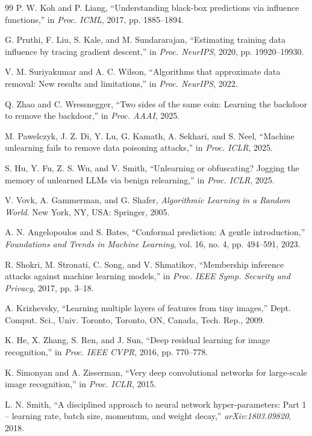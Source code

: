 \begin{thebibliography}{99}
P. W. Koh and P. Liang, ``Understanding black-box predictions via influence functions,'' in \emph{Proc. ICML}, 2017, pp. 1885--1894.

G. Pruthi, F. Liu, S. Kale, and M. Sundararajan, ``Estimating training data influence by tracing gradient descent,'' in \emph{Proc. NeurIPS}, 2020, pp. 19920--19930.

V. M. Suriyakumar and A. C. Wilson, ``Algorithms that approximate data removal: New results and limitations,'' in \emph{Proc. NeurIPS}, 2022.

Q. Zhao and C. Wressnegger, ``Two sides of the same coin: Learning the backdoor to remove the backdoor,'' in \emph{Proc. AAAI}, 2025.

M. Pawelczyk, J. Z. Di, Y. Lu, G. Kamath, A. Sekhari, and S. Neel, ``Machine unlearning fails to remove data poisoning attacks,'' in \emph{Proc. ICLR}, 2025.

S. Hu, Y. Fu, Z. S. Wu, and V. Smith, ``Unlearning or obfuscating? Jogging the memory of unlearned LLMs via benign relearning,'' in \emph{Proc. ICLR}, 2025.

V. Vovk, A. Gammerman, and G. Shafer, \emph{Algorithmic Learning in a Random World}. New York, NY, USA: Springer, 2005.

A. N. Angelopoulos and S. Bates, ``Conformal prediction: A gentle introduction,'' \emph{Foundations and Trends in Machine Learning}, vol. 16, no. 4, pp. 494--591, 2023.

R. Shokri, M. Stronati, C. Song, and V. Shmatikov, ``Membership inference attacks against machine learning models,'' in \emph{Proc. IEEE Symp. Security and Privacy}, 2017, pp. 3--18.

A. Krizhevsky, ``Learning multiple layers of features from tiny images,'' Dept. Comput. Sci., Univ. Toronto, Toronto, ON, Canada, Tech. Rep., 2009.

K. He, X. Zhang, S. Ren, and J. Sun, ``Deep residual learning for image recognition,'' in \emph{Proc. IEEE CVPR}, 2016, pp. 770--778.

K. Simonyan and A. Zisserman, ``Very deep convolutional networks for large-scale image recognition,'' in \emph{Proc. ICLR}, 2015.

L. N. Smith, ``A disciplined approach to neural network hyper-parameters: Part 1 -- learning rate, batch size, momentum, and weight decay,'' \emph{arXiv:1803.09820}, 2018.


\end{thebibliography}
